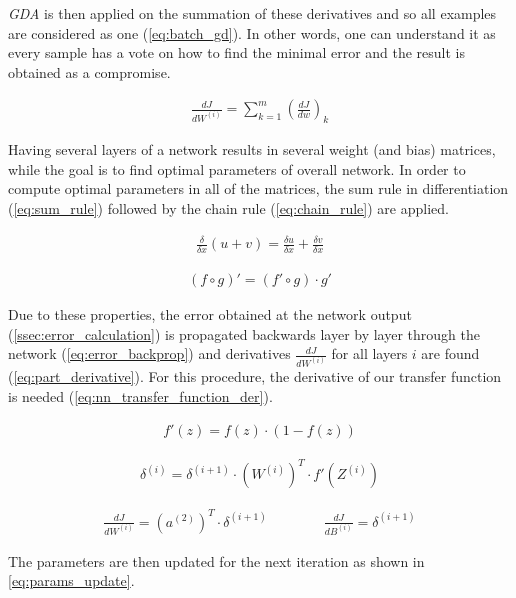 \textit{GDA} is then applied on the summation of these derivatives and so all examples are considered as one (\cref{eq:batch_gd}). In other words, one can understand it as every sample has a vote on how to find the minimal error and the result is obtained as a compromise.

\begin{align} \label{eq:batch_gd}
\frac{dJ}{dW^{(i)}} =  \displaystyle{\sum_{k=1}^m} (\frac{dJ}{dw})_k
\end{align}

Having several layers of a network results in several weight (and bias) matrices, while the goal is to find optimal parameters of overall network. In order to compute optimal parameters in all of the matrices, the sum rule in differentiation (\cref{eq:sum_rule}) followed by the chain rule (\cref{eq:chain_rule}) are applied.

\begin{align} \label{eq:sum_rule}
\frac{\delta}{\delta x} (u+v) = \frac{\delta u}{\delta x} + \frac{\delta v}{\delta x}
\end{align}

\begin{align} \label{eq:chain_rule}
(f \circ g)' = (f' \circ g) \cdot g'
\end{align}

Due to these properties, the error obtained at the network output (\cref{ssec:error_calculation}) is propagated backwards layer by layer through the network (\cref{eq:error_backprop}) and derivatives $ \frac{dJ}{dW^{(i)}} $ for all layers $ i $ are found (\cref{eq:part_derivative}). For this procedure, the derivative of our transfer function is needed (\cref{eq:nn_transfer_function_der}).

\begin{align} \label{eq:nn_transfer_function_der}
f'(z) = f(z) \cdot (1-f(z))
\end{align}

\begin{align} \label{eq:error_backprop}
\delta^{(i)} = \delta^{(i+1)} \cdot (W^{(i)})^T \cdot f'(Z^{(i)})
\end{align}

\begin{align} \label{eq:part_derivative}
\frac{dJ}{dW^{(i)}} = (a^{(2)})^T \cdot \delta^{(i+1)} \qquad\qquad \frac{dJ}{dB^{(i)}} = \delta^{(i+1)}
\end{align}

The parameters are then updated for the next iteration as shown in \cref{eq:params_update}.

